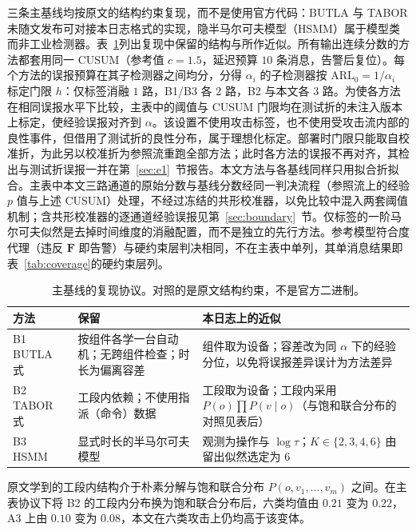 \documentclass[manuscript,screen,review]{acmart}
\begin{document}
三条主基线均按原文的结构约束复现，而不是使用官方代码：{BUTLA} 与 {TABOR} 未随文发布可对接本日志格式的实现，隐半马尔可夫模型（{HSMM}）属于模型类而非工业检测器。表~\ref{tab:repro}列出复现中保留的结构与所作近似。所有输出连续分数的方法都套用同一 {CUSUM}（参考值 $c=1.5$，延迟预算 $10$ 条消息，告警后复位）。每个方法的误报预算在其子检测器之间均分，分得 $\alpha_i$ 的子检测器按 $\mathrm{ARL}_0=1/\alpha_i$ 标定门限 $h$：仅标签消融 $1$ 路，{B1}/{B3} 各 $2$ 路，{B2} 与本文各 $3$ 路。为使各方法在相同误报水平下比较，主表中的阈值与 {CUSUM} 门限均在测试折的未注入版本上标定，使经验误报对齐到 $\alpha$。该设置不使用攻击标签，也不使用受攻击流内部的良性事件，但借用了测试折的良性分布，属于理想化标定。部署时门限只能取自校准折，为此另以校准折为参照流重跑全部方法；此时各方法的误报不再对齐，其检出与测试折误报一并在第~\ref{sec:e1}~节报告。本文方法与各基线同样只用拟合折拟合。主表中本文三路通道的原始分数与基线分数经同一判决流程（参照流上的经验 $p$ 值与上述 {CUSUM}）处理，不经过冻结的共形校准器，以免比较中混入两套阈值机制；含共形校准器的逐通道经验误报见第~\ref{sec:boundary}~节。仅标签的一阶马尔可夫似然是去掉时间维度的消融配置，而不是独立的先行方法。参考模型符合度代理（违反 $\mathbf F$ 即告警）与硬约束层判决相同，不在主表中单列，其单消息结果即表~\ref{tab:coverage}的硬约束层列。

\begin{table}[!t]
\renewcommand{\arraystretch}{1.12}
\caption{主基线的复现协议。对照的是原文结构约束，不是官方二进制。}
\label{tab:repro}
\centering
\small
\begin{tabular}{lp{3.4cm}p{4.4cm}}
\toprule
方法 & 保留 & 本日志上的近似 \\
\midrule
{B1} {BUTLA} 式~\cite{maier2011timed}
  & 按组件各学一台自动机；无跨组件检查；时长为偏离容差
  & 组件取为设备；容差改为同 $\alpha$ 下的经验分位，以免将误报差异误计为方法差异 \\
{B2} {TABOR} 式~\cite{lin2018tabor}
  & 工段内依赖；不使用指派（命令）数据
  & 工段取为设备；工段内采用 $P(o)\prod P(v\mid o)$（与饱和联合分布的对照见表后） \\
{B3} {HSMM}~\cite{tan2008hsmm}
  & 显式时长的半马尔可夫模型
  & 观测为操作与 $\log\tau$；$K\in\{2,3,4,6\}$ 由留出似然选定为 $6$ \\
\bottomrule
\end{tabular}
\end{table}

原文学到的工段内结构介于朴素分解与饱和联合分布 $P(o,v_1,\dots,v_m)$ 之间。在主表协议下将 {B2} 的工段内分布换为饱和联合分布后，六类均值由 $0.21$ 变为 $0.22$，{A3} 上由 $0.10$ 变为 $0.08$，本文在六类攻击上仍均高于该变体。
\end{document}
